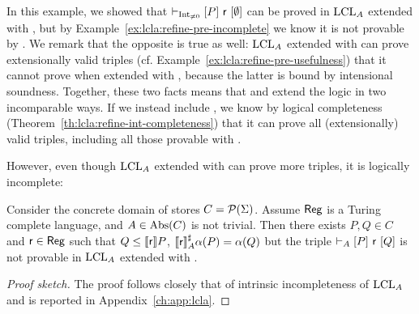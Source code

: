 In this example, we showed that $\vdash_{\text{Int}_{\neq 0}}\nobreak[P]~\mathsf{r}~[\emptyset]$ can be proved in $\text{LCL}_A$ extended with , but by Example~\ref{ex:lcla:refine-pre-incomplete} we know it is not provable by . We remark that the opposite is true as well: $\text{LCL}_A$ extended with  can prove extensionally valid triples (cf. Example~\ref{ex:lcla:refine-pre-usefulness}) that it cannot prove when extended with , because the latter is bound by intensional soundness. Together, these two facts means that  and  extend the logic in two incomparable ways. If we instead include , we know by logical completeness (Theorem~\ref{th:lcla:refine-int-completeness}) that it can prove all (extensionally) valid triples, including all those provable with .

However, even though $\text{LCL}_A$ extended with  can prove more triples, it is logically incomplete:

\begin{theorem}\label{th:lcla:intrinsic-incompl-simplify}
	Consider the concrete domain of stores $C = \mathcal{P}(\Sigma)$. Assume $\mathsf{Reg}$ is a Turing complete language, and $A \in \text{\normalfont Abs}(C)$ is not trivial. Then there exists $P, Q \in C$ and $\mathsf{r} \in \mathsf{Reg}$ such that $Q \le \llbracket\mathsf{r}\rrbracket P$, $\llbracket\mathsf{r}\rrbracket^{\sharp}_A \alpha(P) = \alpha(Q)$ but the triple $\vdash_{A}\nobreak[P]~\mathsf{r}~[Q]$ is not provable in $\text{LCL}_A$ extended with .
\end{theorem}
\begin{proof}[Proof sketch]
	The proof follows closely that of intrinsic incompleteness of $\text{LCL}_A$ \cite[Theorem~5.12]{BGGR21} and is reported in Appendix~\ref{ch:app:lcla}.
\end{proof}

